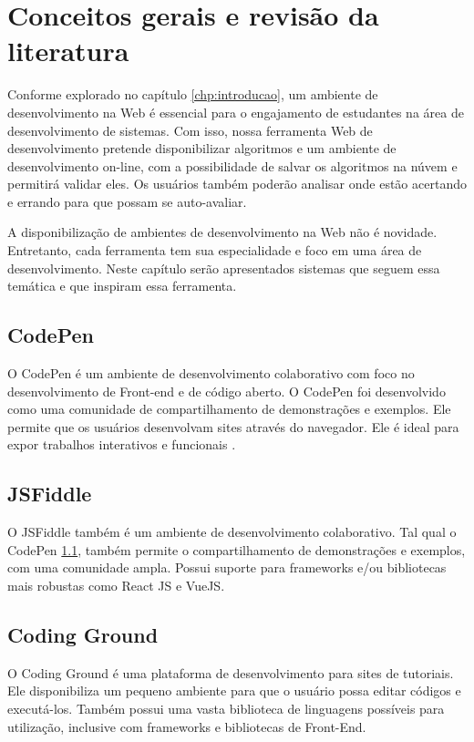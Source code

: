 \chapter{Conceitos gerais e revisão da literatura}
\label{chp:conceitos-gerais}
Conforme explorado no capítulo \ref{chp:introducao}, um ambiente de desenvolvimento na Web é essencial para o engajamento de estudantes na área de desenvolvimento de sistemas. Com isso, nossa ferramenta Web de desenvolvimento pretende disponibilizar algoritmos e um ambiente de desenvolvimento on-line, com a possibilidade de salvar os algoritmos na núvem e permitirá validar eles. Os usuários também poderão analisar onde estão acertando e errando para que possam se auto-avaliar.

A disponibilização de ambientes de desenvolvimento na Web não é novidade. Entretanto, cada ferramenta tem sua especialidade e foco em uma área de desenvolvimento. Neste capítulo serão apresentados sistemas que seguem essa temática e que inspiram essa ferramenta.

\section{CodePen}
\label{sec:codepen}
O CodePen é um ambiente de desenvolvimento colaborativo com foco no desenvolvimento de Front-end e de código aberto. O CodePen foi desenvolvido como uma comunidade de compartilhamento de demonstrações e exemplos. Ele permite que os usuários desenvolvam sites através do navegador. Ele é ideal para expor trabalhos interativos e funcionais \cite{fiala2016collaborative}.

\section{JSFiddle}
\label{sec:jsfiddle}
O JSFiddle também é um ambiente de desenvolvimento colaborativo. Tal qual o CodePen \ref{sec:codepen}, também permite o compartilhamento de demonstrações e exemplos, com uma comunidade ampla. Possui suporte para frameworks e/ou bibliotecas mais robustas como React JS e VueJS.

\section{Coding Ground}
\label{sec:codingground}
O Coding Ground é uma plataforma de desenvolvimento para sites de tutoriais. Ele disponibiliza um pequeno ambiente para que o usuário possa editar códigos e executá-los. Também possui uma vasta biblioteca de linguagens possíveis para utilização, inclusive com frameworks e bibliotecas de Front-End.

